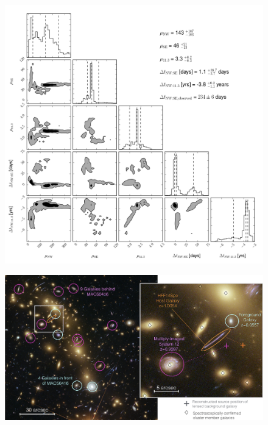 










\begin{figure}[tbp]
  \begin{center}
    \includegraphics[width=\textwidth]{composite_lens_model_contours}
    \caption{ \protect}
  \end{center}
\end{figure}

\begin{figure}[tbp]
  \begin{center}
    \includegraphics[width=\textwidth]{macs0416_lineofsight_lensing.png}
    \caption{\protect}
  \end{center}
\end{figure}

